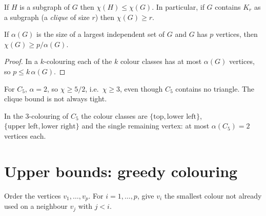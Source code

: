 \begin{proposition}
If $H$ is a subgraph of $G$ then $\chi(H) \le \chi(G)$. In particular, if $G$ contains $K_r$ as
a subgraph (a \emph{clique} of size $r$) then $\chi(G) \ge r$.
\end{proposition}

\begin{proposition}
If $\alpha(G)$ is the size of a largest independent set of $G$ and $G$ has $p$ vertices, then
$\chi(G) \ge p/\alpha(G)$.
\end{proposition}
\begin{proof}
In a $k$-colouring each of the $k$ colour classes has at most $\alpha(G)$ vertices, so
$p \le k\,\alpha(G)$.
\end{proof}

\begin{example}
For $C_5$, $\alpha = 2$, so $\chi \ge 5/2$, i.e.\ $\chi \ge 3$, even though $C_5$ contains no
triangle. The clique bound is not always tight.
\end{example}

\begin{center}
\end{center}
In the $3$-colouring of $C_5$ the colour classes are $\{\text{top}, \text{lower left}\}$,
$\{\text{upper left}, \text{lower right}\}$ and the single remaining vertex: at most
$\alpha(C_5) = 2$ vertices each.

\section{Upper bounds: greedy colouring}

\begin{important}
Order the vertices $v_1, \dots, v_p$. For $i = 1, \dots, p$, give $v_i$ the smallest colour not
already used on a neighbour $v_j$ with $j < i$.
\end{important}

